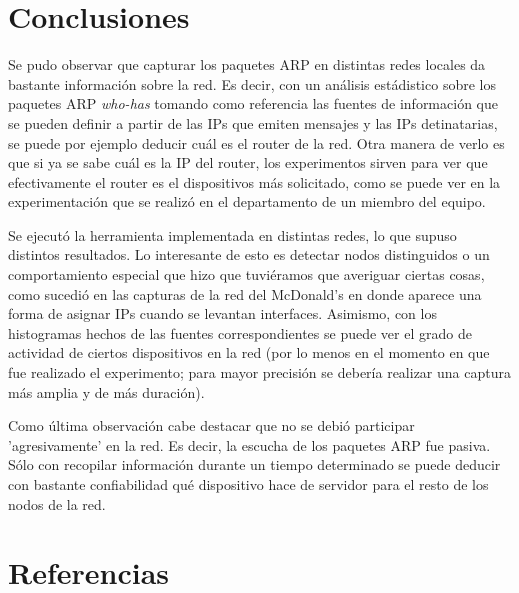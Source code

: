\section{Conclusiones}

Se pudo observar que capturar los paquetes ARP en distintas redes locales da bastante informaci\'on
sobre la red. Es decir, con un an\'alisis est\'adistico sobre los paquetes ARP \emph{who-has} 
tomando como referencia las fuentes de informaci\'on que se pueden definir a partir de las IPs
que emiten mensajes y las IPs detinatarias, se puede por ejemplo deducir cu\'al es el router de
la red. Otra manera de verlo es que si ya se sabe cu\'al es la IP del router, los experimentos
sirven para ver que efectivamente el router es el dispositivos m\'as solicitado, como se puede
ver en la experimentaci\'on que se realiz\'o en el departamento de un miembro del equipo.

Se ejecut\'o la herramienta implementada en distintas redes, lo que supuso distintos resultados. 
Lo interesante de esto es detectar nodos distinguidos o un comportamiento especial que hizo que
tuvi\'eramos que averiguar ciertas cosas, como sucedi\'o en las capturas de la red del McDonald's
en donde aparece una forma de asignar IPs cuando se levantan interfaces. Asimismo, con los 
histogramas hechos de las fuentes correspondientes se puede ver el grado de actividad de ciertos
dispositivos en la red (por lo menos en el momento en que fue realizado el experimento; para mayor
precisi\'on se deber\'ia realizar una captura m\'as amplia y de m\'as duraci\'on).

Como \'ultima observaci\'on cabe destacar que no se debi\'o participar 'agresivamente' en la red. Es
decir, la escucha de los paquetes ARP fue pasiva. S\'olo con recopilar informaci\'on durante un 
tiempo determinado se puede deducir con bastante confiabilidad qu\'e dispositivo hace de servidor
para el resto de los nodos de la red. 

\newpage

\section{Referencias}\label{sec:MatrizCuadrada}

